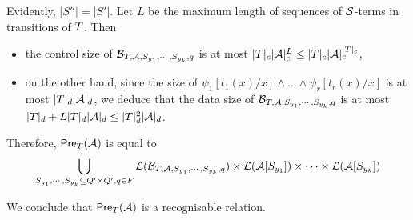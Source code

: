 %
%
Evidently, $|S''| = |S'|$.  Let $L$ be the maximum length of sequences of $\mathcal{S}$-terms in transitions of $T$. Then 
\begin{itemize}
\item the control size of $\mathcal{B}_{T, \mathcal{A}, S_{y_1}, \cdots, S_{y_k}, q}$ is at most $|T|_c |\mathcal{A}|_c^{L} \le |T|_c |\mathcal{A}|_c^{|T|_c}$,
\item  on the other hand, since the size of $\psi_1[t_1(x)/x] \wedge \ldots \wedge \psi_r[t_r(x)/x]$ is at most $|T|_d |\mathcal{A}|_d$, we deduce that the data size of $\mathcal{B}_{T, \mathcal{A}, S_{y_1}, \cdots, S_{y_k}, q}$ is at most $|T|_d + L |T|_d |\mathcal{A}|_d \le |T|^2_d |\mathcal{A}|_d$.
\end{itemize}


Therefore, $\textsf{Pre}_{T}(\mathcal{A})$ is equal to 
\[
\bigcup_{S_{y_1}, \cdots, S_{y_k} \subseteq Q' \times Q', q\in F} \mathcal{L}(\mathcal{B}_{T, \mathcal{A}, S_{y_1}, \cdots, S_{y_k},q}) \times \mathcal{L}(\mathcal{A}[S_{y_1}]) \times \cdots  \times \mathcal{L}(\mathcal{A}[S_{y_k}])\]

We conclude that $\textsf{Pre}_{T}(\mathcal{A})$ is a recognisable relation. 

